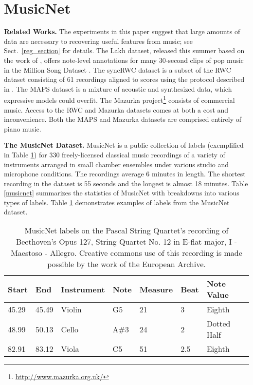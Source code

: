 \documentclass{article} \usepackage{iclr2017_conference,times}
\begin{document}
 \section{MusicNet}

\textbf{Related Works. } The experiments in this paper suggest that large amounts of data are necessary to recovering useful features from music; see Sect.~\ref{reg_section} for details. The Lakh dataset, released this summer based on the work of \cite{lakh}, offers note-level annotations for many 30-second clips of pop music in the Million Song Dataset \citep{msd}. The syncRWC dataset is a subset of the RWC dataset \citep{rwc} consisting of 61 recordings aligned to scores using the protocol described in \cite{syncrwc}. The MAPS dataset \citep{maps} is a mixture of acoustic and synthesized data, which expressive models could overfit. The Mazurka project\footnote{\url{http://www.mazurka.org.uk/}} consists of commercial music. Access to the RWC and Mazurka datasets comes at both a cost and inconvenience. Both the MAPS and Mazurka datasets are comprised entirely of piano music. 

\textbf{The MusicNet Dataset. } MusicNet is a public collection of labels (exemplified in Table \ref{datapoints}) for 330 freely-licensed classical music recordings of a variety of instruments arranged in small chamber ensembles under various studio and microphone conditions. The recordings average 6 minutes in length. The shortest recording in the dataset is 55 seconds and the longest is almost 18 minutes. Table \ref{musicnet} summarizes the statistics of MusicNet with breakdowns into various types of labels. Table \ref{datapoints} demonstrates examples of labels from the MusicNet dataset.

\begin{table}[h]
  \centering
  \begin{tabular}{lllllll}
    \toprule
    \cmidrule{1-7}
    Start & End & Instrument & Note & Measure & Beat & Note Value \\
    \midrule
    45.29 & 45.49 & Violin  & G5 & 21 & 3 & Eighth \\
    48.99 & 50.13 & Cello & A\#3 & 24 & 2 & Dotted Half \\
    82.91 & 83.12 & Viola & C5 & 51 & 2.5 & Eighth \\
    
    \bottomrule
  \end{tabular}
  \caption{MusicNet labels on the Pascal String Quartet's recording of Beethoven's Opus 127, String Quartet No. 12 in E-flat major, I - Maestoso - Allegro. Creative commons use of this recording is made possible by the work of the European Archive.}
  \label{datapoints}
\end{table}
\end{document}
